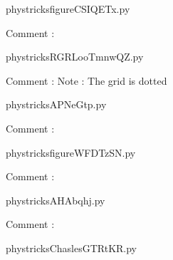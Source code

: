     \newcommand{\CaptionFigfigureCSIQETx}{<+Type your caption here+>}
    \begin{center}
        
    \end{center}
    phystricksfigureCSIQETx.py

    Comment : 

    \clearpage
    


    \newcommand{\CaptionFigRGRLooTmnwQZ}{<+Type your caption here+>}
    \begin{center}
        
    \end{center}
    phystricksRGRLooTmnwQZ.py

    Comment : Note : The grid is dotted

    \clearpage
    


    \newcommand{\CaptionFigAPNeGtp}{<+Type your caption here+>}
    \begin{center}
        
    \end{center}
    phystricksAPNeGtp.py

    Comment : 

    \clearpage
    


    \newcommand{\CaptionFigfigureWFDTzSN}{<+Type your caption here+>}
    \begin{center}
        
    \end{center}
    phystricksfigureWFDTzSN.py

    Comment : 

    \clearpage
    


    \newcommand{\CaptionFigAHAbqhj}{<+Type your caption here+>}
    \begin{center}
        
    \end{center}
    phystricksAHAbqhj.py

    Comment : 

    \clearpage
    


    \newcommand{\CaptionFigChaslesGTRtKR}{<+Type your caption here+>}
    \begin{center}
        
    \end{center}
    phystricksChaslesGTRtKR.py


